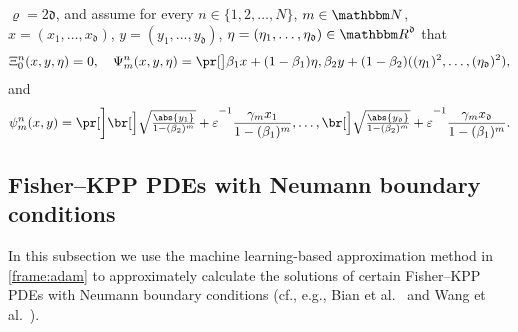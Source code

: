 \begin{algo}
			$ \varrho = 2 \mathfrak{d} $,
	and assume 
		for every
			$n \in \{1,2,\dots,N\}$,
			$m\in\N$,
			$x=(x_1, \ldots, x_{\mathfrak{d}})$, $y=(y_1, \ldots, y_{\mathfrak{d}})$, $\eta = ( \eta_1, \ldots , \eta_{\mathfrak{d}} )\in\R^{\mathfrak{d}}$
		that
		\begin{align}\label{eq:examples_setting_moment_estimation}
			\Xi^n_0(x,y,\eta) = 0,\quad 
			\Psi^n_m ( x , y , \eta )
			=
			\bpr{\beta_1 x + (1-\beta_1) \eta, \beta_2 y + (1-\beta_2) ((\eta_1)^2,\ldots,(\eta_{\mathfrak{d}})^2)},
		\end{align}
		and
		\begin{align}\label{eq:examples_setting_adam_grad_update}
			\psi^n_m ( x,y ) 
			=
			\bbbpr{
			\bbbr{
			\sqrt{\tfrac{\abs{y_1}}{1-(\beta_2)^m}} + \varepsilon
			}^{-1}
			\frac{\gamma_m x_{1}}{1-(\beta_1)^m},
			\ldots,
			\bbbr{
			\sqrt{\tfrac{\abs{y_{\mathfrak{d}}}}{1-(\beta_2)^m}} + \varepsilon
			}^{-1}
			\frac{\gamma_m x_{\mathfrak{d}}}{1-(\beta_1)^m}
			}
			.
	\end{align}
\end{algo}
%
%
%


\subsection{Fisher--KPP PDEs with Neumann boundary conditions}
\label{subsec:fisherKPP_neumann_r}
In this subsection we use the machine learning-based approximation method in \cref{frame:adam} to approximately calculate the solutions of certain Fisher--KPP PDEs with Neumann boundary conditions (cf., e.g., Bian et al.~\cite{Bian2017} and Wang et al.~\cite{Wang2021}).

